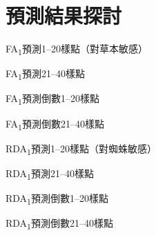 \documentclass[10pt, aspectratio=1610, xcolor=table]{beamer}
\begin{document}
\section{預測結果探討}

\begin{frame}{FA\textsubscript{1}預測1--20樣點（對草本敏感）}

\end{frame}
\clearpage

\begin{frame}{FA\textsubscript{1}預測21--40樣點}

\end{frame}
\clearpage

\begin{frame}{FA\textsubscript{1}預測倒數1--20樣點}

\end{frame}
\clearpage

\begin{frame}{FA\textsubscript{1}預測倒數21--40樣點}

\end{frame}
\clearpage

\begin{frame}{RDA\textsubscript{1}預測1--20樣點（對蜘蛛敏感）}

\end{frame}
\clearpage

\begin{frame}{RDA\textsubscript{1}預測21--40樣點}

\end{frame}
\clearpage

\begin{frame}{RDA\textsubscript{1}預測倒數1--20樣點}

\end{frame}
\clearpage

\begin{frame}{RDA\textsubscript{1}預測倒數21--40樣點}

\end{frame}
\clearpage
\end{document}
